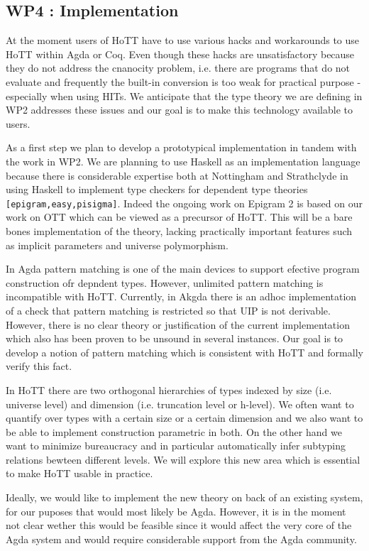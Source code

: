 \documentclass[twocolumn,a4paper,11pt]{article}
\renewcommand{\cite}[1]{{\tt[#1]}}
\begin{document}
\subsection*{WP4 : Implementation} 

At the moment users of HoTT have to use various hacks and workarounds
to use HoTT within Agda or Coq. Even though these hacks are
unsatisfactory because they do not address the cnanocity problem,
i.e. there are programs that do not evaluate and frequently the
built-in conversion is too weak for practical purpose - especially
when using HITs. We anticipate that the type theory we are defining in
WP2 addresses these issues and our goal is to make this technology
available to users.

As a first step we plan to develop a prototypical implementation in
tandem with the work in WP2. We are planning to use Haskell as an
implementation language because there is considerable expertise both
at Nottingham and Strathclyde in using Haskell to implement type
checkers for dependent type theories \cite{epigram,easy,pisigma}.
Indeed the ongoing work on Epigram 2 is based on our work on OTT which
can be viewed as a precursor of HoTT.
This will be a bare bones implementation of the theory, lacking
practically important features such as implicit parameters and
universe polymorphism.

In Agda pattern matching is one of the main devices to support
efective program construction ofr depndent types. However, unlimited
pattern matching is incompatible with HoTT. Currently, in Akgda there
is an adhoc implementation of a check that pattern matching is
restricted so that UIP is not derivable. However, there is no clear
theory or justification of the current implementation which also has
been proven to be unsound in several instances. Our goal is to develop
a notion of pattern matching which is consistent with HoTT and
formally verify this fact. 

In HoTT there are two orthogonal hierarchies of types indexed by size
(i.e. universe level) and dimension (i.e. truncation level or h-level). We often
want to quantify over types with a certain size or a certain dimension
and we also want to be able to implement construction parametric in
both. On the other hand we want to minimize bureaucracy and in
particular automatically infer subtyping relations bewteen different
levels. We will explore this new area which is essential to make HoTT
usable in practice.

Ideally, we would like to implement the new theory on back of an
existing system, for our puposes that would most likely be Agda. 
However, it is in the moment not clear wether this would be feasible
since it would affect the very core of the Agda system and would
require considerable support from the Agda community.
\end{document}
